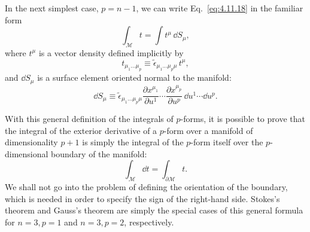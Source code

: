In the next simplest case, \(p=n-1\), we can write
Eq.~\eqref{eq:4.11.18} in the familiar form
\[
  \int_{\mathcal M}t
  =
  \int t^\mu\,\dd S_\mu,
\]
where \(t^\mu\) is a vector density defined implicitly by
\[
  t_{\mu_1\ldots\mu_p}
  \equiv
  \tilde\epsilon_{\mu_1\ldots\mu_p\mu}\,t^\mu,
\]
and \(\dd S_\mu\) is a surface element oriented normal to the manifold:
\[
  \dd S_\mu
  \equiv
  \tilde\epsilon_{\mu_1\ldots\mu_p\mu}
  \frac{\partial x^{\mu_1}}{\partial u^1}
  \cdots
  \frac{\partial x^{\mu_p}}{\partial u^p}
  \,\dd u^1\cdots\dd u^p.
\]

With this general definition of the integrals of \(p\)-forms, it is possible
to prove that the integral of the exterior derivative of a \(p\)-form over
a manifold of dimensionality \(p+1\) is simply the integral of the
\(p\)-form itself over the \(p\)-dimensional boundary of the manifold:
\begin{equation}
  \int_{\mathcal M}\dd t
  =
  \int_{\partial\mathcal M}t.
  \tag{4.11.19}\label{eq:4.11.19}
\end{equation}
We shall not go into the problem of defining the orientation of the
boundary, which is needed in order to specify the sign of the right-hand
side. Stokes's theorem and Gauss's theorem are simply the special cases of
this general formula for \(n=3,p=1\) and \(n=3,p=2\), respectively.
